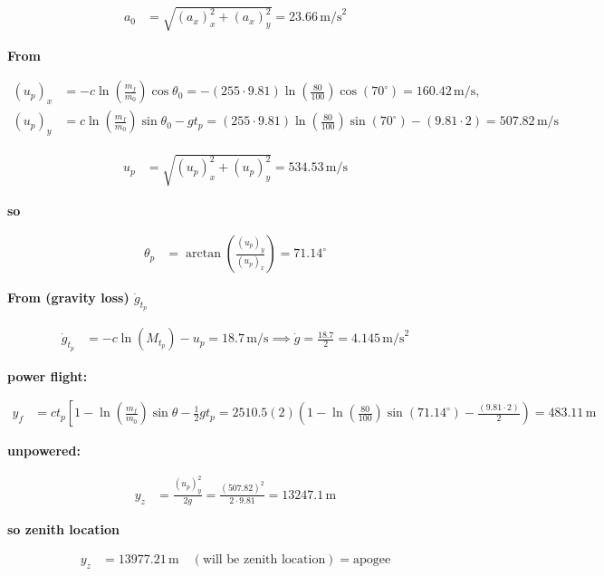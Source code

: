 \documentclass{article}
\begin{document}
\[
\begin{aligned}
    a_0 &= \sqrt{(a_x)_x^2 + (a_x)_y^2} = 23.66 \, \text{m/s}^2
\end{aligned}
\]

\textbf{From}

\[
\begin{aligned}
    (u_p)_x &= -c \ln\left(\frac{m_f}{m_0}\right) \cos\theta_0 = -(255 \cdot 9.81) \ln\left(\frac{80}{100}\right) \cos(70^\circ) = 160.42 \, \text{m/s}, \\
    (u_p)_y &= c \ln\left(\frac{m_f}{m_0}\right) \sin\theta_0 - g t_p = (255 \cdot 9.81) \ln\left(\frac{80}{100}\right) \sin(70^\circ) - (9.81 \cdot 2) = 507.82 \, \text{m/s}
\end{aligned}
\]

\[
\begin{aligned}
    u_p &= \sqrt{(u_p)_x^2 + (u_p)_y^2} = 534.53 \, \text{m/s}
\end{aligned}
\]

\textbf{so}

\[
\begin{aligned}
    \theta_p &= \arctan\left(\frac{(u_p)_y}{(u_p)_x}\right) = 71.14^\circ
\end{aligned}
\]

\textbf{From (gravity loss) $\dot{g}_{t_p}$}

\[
\begin{aligned}
    \dot{g}_{t_p} &= -c \ln(M_{t_p}) - u_p = 18.7 \, \text{m/s} \implies \dot{g} = \frac{18.7}{2} = 4.145 \, \text{m/s}^2
\end{aligned}
\]

\textbf{power flight:}

\[
\begin{aligned}
    y_f &= c t_p \left[1 - \ln\left(\frac{m_f}{m_0}\right) \sin\theta - \frac{1}{2} g t_p = 2510.5 (2) \left(1 - \ln\left(\frac{80}{100}\right) \sin(71.14^\circ) - \frac{(9.81 \cdot 2)}{2}\right) = 483.11 \, \text{m}
\end{aligned}
\]

\textbf{unpowered:}

\[
\begin{aligned}
    y_z &= \frac{(u_p)_y^2}{2g} = \frac{(507.82)^2}{2 \cdot 9.81} = 13247.1 \, \text{m}
\end{aligned}
\]

\textbf{so zenith location}

\[
\begin{aligned}
    y_z &= 13977.21 \, \text{m} \quad (\text{will be zenith location}) = \text{apogee}
\end{aligned}
\]
\end{document}
